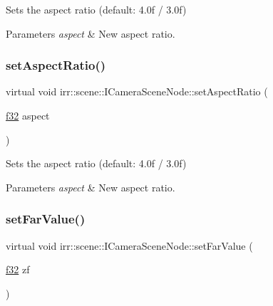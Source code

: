 Sets the aspect ratio (default\+: 4.\+0f / 3.\+0f) 


\begin{DoxyParams}{Parameters}
{\em aspect} & New aspect ratio. \\
\hline
\end{DoxyParams}
\mbox{\label{classirr_1_1scene_1_1ICameraSceneNode_a5c3728a61a208376b9df6a701f4a5b3c}} 
\subsubsection{\texorpdfstring{set\+Aspect\+Ratio()}{setAspectRatio()}\hspace{0.1cm}{\footnotesize\ttfamily [2/2]}}
{\footnotesize\ttfamily virtual void irr\+::scene\+::\+I\+Camera\+Scene\+Node\+::set\+Aspect\+Ratio (\begin{DoxyParamCaption}\item[{\hyperlink{namespaceirr_a0277be98d67dc26ff93b1a6a1d086b07}{f32}}]{aspect }\end{DoxyParamCaption})\hspace{0.3cm}{\ttfamily [pure virtual]}}



Sets the aspect ratio (default\+: 4.\+0f / 3.\+0f) 


\begin{DoxyParams}{Parameters}
{\em aspect} & New aspect ratio. \\
\hline
\end{DoxyParams}
\mbox{\label{classirr_1_1scene_1_1ICameraSceneNode_ab7e427dd639b6bb63f648d6d087da1ea}} 
\subsubsection{\texorpdfstring{set\+Far\+Value()}{setFarValue()}\hspace{0.1cm}{\footnotesize\ttfamily [1/2]}}
{\footnotesize\ttfamily virtual void irr\+::scene\+::\+I\+Camera\+Scene\+Node\+::set\+Far\+Value (\begin{DoxyParamCaption}\item[{\hyperlink{namespaceirr_a0277be98d67dc26ff93b1a6a1d086b07}{f32}}]{zf }\end{DoxyParamCaption})\hspace{0.3cm}{\ttfamily [pure virtual]}}



